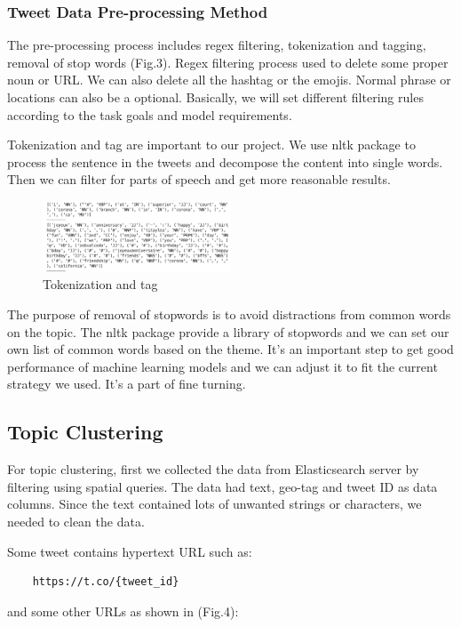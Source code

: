 \subsubsection{Tweet Data Pre-processing Method}
The pre-processing process includes regex filtering, tokenization and tagging,
removal of stop words (Fig.3). Regex filtering process used to delete some
proper noun or URL. We can also delete all the hashtag or the emojis. Normal
phrase or locations can also be a optional. Basically, we will set different
filtering rules according to the task goals and model requirements. 

Tokenization and tag are important to our project. We use nltk package to
process the sentence in the tweets and decompose the content into single
words. Then we can filter for parts of speech and get more reasonable
results. 
\begin{figure}[h]
\centering
\includegraphics[width=0.5\textwidth]{imgs/tokenization.png}
\caption{\label{fig:Research process} Tokenization and tag}
\end{figure}
The purpose of removal of stopwords is to avoid distractions from common words
on the topic. The nltk package provide a library of stopwords and we can set
our own list of common words based on the theme. It's an important step to
get good performance of machine learning models and we can adjust it to fit
the current strategy we used. It's a part of fine turning. 

\subsection{Topic Clustering}
For topic clustering, first we collected the data from Elasticsearch server by
filtering using spatial queries. The data had text, geo-tag and tweet ID as
data columns. Since the text contained lots of unwanted strings or
characters, we needed to clean the data. 

Some tweet contains hypertext URL such as: 
\begin{verbatim}
    https://t.co/{tweet_id}
\end{verbatim} and some other URLs as shown in (Fig.4):
    
